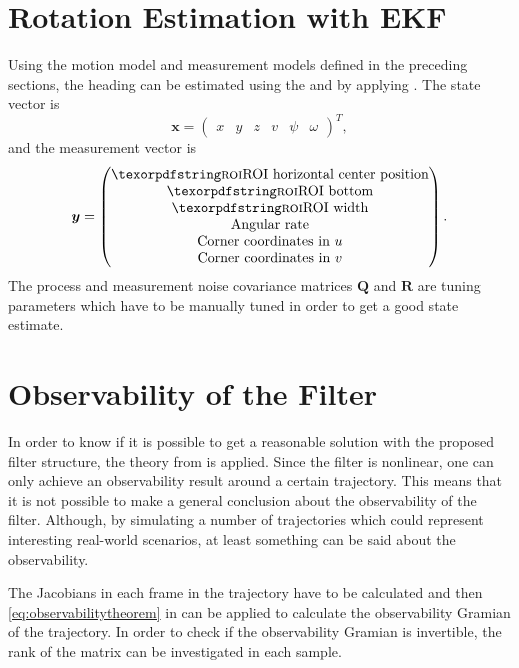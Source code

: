 \section{Rotation Estimation with EKF}
Using the motion model and measurement models defined in the preceding sections, the heading can be estimated using the \abbrEKF and by applying .
The state vector is
\begin{equation*}
	\bm{x} =
	\begin{pmatrix}
		x & y & z & v & \psi & \omega
	\end{pmatrix}
	^T
	,
\end{equation*}
and the measurement vector is
\begin{equation*}
	\bm{y} =
	\begin{pmatrix}
		\text{\abbrROI horizontal center position} \\
		\text{\abbrROI bottom} \\
		\text{\abbrROI width} \\
		\text{Angular rate} \\
		\text{Corner coordinates in } u \\
		\text{Corner coordinates in } v
	\end{pmatrix}
	.
\end{equation*}
The process and measurement noise covariance matrices $\bm{Q}$ and $\bm{R}$ are tuning parameters which have to be manually tuned in order to get a good state estimate.

\section{Observability of the Filter}
\label{sec:observabilitymethod}
In order to know if it is possible to get a reasonable solution with the proposed filter structure, the theory from  is applied.
Since the filter is nonlinear, one can only achieve an observability result around a certain trajectory.
This means that it is not possible to make a general conclusion about the observability of the filter.
Although, by simulating a number of trajectories which could represent interesting real-world scenarios, at least something can be said about the observability.

The Jacobians in each frame in the trajectory have to be calculated and then \eqref{eq:observabilitytheorem} in  can be applied to calculate the observability Gramian of the trajectory.
In order to check if the observability Gramian is invertible, the rank of the matrix can be investigated in each sample.

